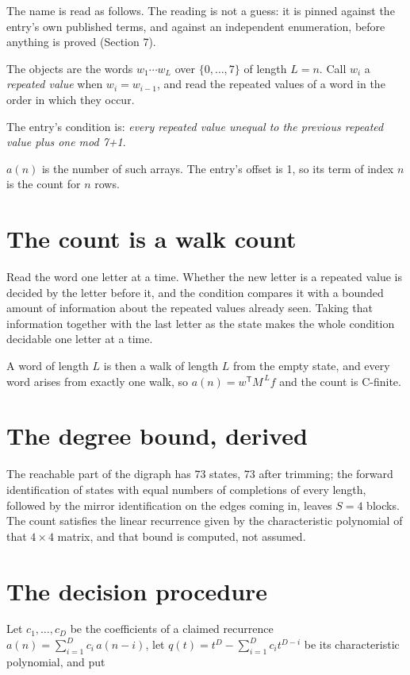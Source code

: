 \documentclass[11pt]{article}
\theoremstyle{definition}
\begin{document}
The name is read as follows. The reading is not a guess: it is pinned against the entry's own published terms, and against an independent enumeration, before anything is proved (Section 7).

The objects are the words $w_1\cdots w_L$ over $\{0,\dots,7\}$ of length $L = n$. Call $w_i$ a {\itshape repeated value} when $w_i = w_{i-1}$, and read the repeated values of a word in the order in which they occur.

The entry's condition is: {\itshape every repeated value unequal to the previous repeated value plus one mod 7+1}.

$a(n)$ is the number of such arrays. The entry's offset is 1, so its term of index $n$ is the count for $n$ rows.

\section{The count is a walk count}

Read the word one letter at a time. Whether the new letter is a repeated value is decided by the letter before it, and the condition compares it with a bounded amount of information about the repeated values already seen. Taking that information together with the last letter as the state makes the whole condition decidable one letter at a time.

A word of length $L$ is then a walk of length $L$ from the empty state, and every word arises from exactly one walk, so $a(n) = w^{\mathsf T}M^{\,L}f$ and the count is C-finite.

\section{The degree bound, derived}

The reachable part of the digraph has $73$ states, $73$ after trimming; the forward identification of states with equal numbers of completions of every length, followed by the mirror identification on the edges coming in, leaves $S = 4$ blocks. The count satisfies the linear recurrence given by the characteristic polynomial of that $4\times4$ matrix, and that bound is computed, not assumed.

\section{The decision procedure}

Let $c_1,\dots,c_D$ be the coefficients of a claimed recurrence $a(n) = \sum_{i=1}^{D} c_i\,a(n-i)$, let $q(t) = t^{D} - \sum_{i=1}^{D} c_i t^{D-i}$ be its characteristic polynomial, and put
\end{document}
